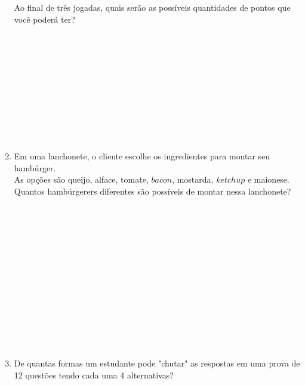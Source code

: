 \documentclass[a4paper,14pt]{article}
\begin{document}
\begin{multicols}{2}
\begin{enumerate}
			Ao final de três jogadas, quais serão as possíveis quantidades de pontos que você poderá ter? \\\\\\\\\\\\\\\\\\\\\\
			\item Em uma lanchonete, o cliente escolhe os ingredientes para montar seu hambúrger. \\
			As opções são queijo, alface, tomate, $bacon$, mostarda, $ketchup$ e maionese. Quantos hambúrgerers diferentes são possíveis de montar nessa lanchonete? \\\\\\\\\\\\\\\\\\\\\\\\\\\\
			\item De quantas formas um estudante pode "chutar" as respostas em uma prova de 12 questões tendo cada uma 4 alternativas?
		\end{enumerate}
		$~$ \\ $~$ \\ $~$ \\ $~$ \\ $~$ \\ $~$ \\ $~$ \\ $~$ \\ $~$ \\ $~$ \\ $~$ \\ $~$ \\ $~$ 
	\end{multicols}
\end{document}
